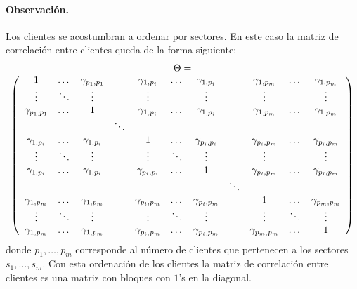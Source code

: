 \paragraph{Observaci\'on.} Los clientes se acostumbran a ordenar por sectores. En este
caso la matriz de correlaci\'on entre clientes queda de la forma siguiente:
\begin{displaymath}
\begin{array}{c}
\Theta = \\
\left(
\begin{array}{ccccccccccc}
1                & \dots    & \gamma_{p_1,p_1}  &          & \gamma_{1,p_i}   & \dots   & \gamma_{1,p_i}    &         & \gamma_{1,p_m}   & \dots      & \gamma_{1,p_m}   \cr
\vdots           & \ddots   & \vdots            &          & \vdots           &         & \vdots            &         & \vdots           &            & \vdots           \cr
\gamma_{p_1,p_1} & \dots    & 1                 &          & \gamma_{1,p_i}   & \dots   & \gamma_{1,p_i}    &         & \gamma_{1,p_m}   & \dots      & \gamma_{1,p_m}   \cr
                 
                 &          &                   & \ddots   &                  &         &                   &         &                  &            &                  \cr

\gamma_{1,p_i}   & \dots    & \gamma_{1,p_i}    &          & 1                & \dots   & \gamma_{p_i,p_i}  &         & \gamma_{p_i,p_m} & \dots      & \gamma_{p_i,p_m} \cr
\vdots           & \ddots   & \vdots            &          & \vdots           & \ddots  & \vdots            &         & \vdots           &            & \vdots           \cr
\gamma_{1,p_i}   & \dots    & \gamma_{1,p_i}    &          & \gamma_{p_i,p_i} & \dots   & 1                 &         & \gamma_{p_i,p_m} & \dots      & \gamma_{p_i,p_m} \cr

                 &          &                   &          &                  &         &                   & \ddots  &                  &            &                  \cr

\gamma_{1,p_m}   & \dots    & \gamma_{1,p_m}    &          & \gamma_{p_i,p_m} & \dots   & \gamma_{p_i,p_m}  &         & 1                & \dots      & \gamma_{p_m,p_m} \cr
\vdots           & \ddots   & \vdots            &          & \vdots           & \ddots  & \vdots            &         & \vdots           & \ddots     & \vdots           \cr
\gamma_{1,p_m}   & \dots    & \gamma_{1,p_m}    &          & \gamma_{p_i,p_m} & \dots   & \gamma_{p_i,p_m}  &         & \gamma_{p_m,p_m} & \dots      & 1               
\end{array}
\right)
\end{array}
\end{displaymath}
donde $p_1, \dots, p_m$ corresponde al n\'umero de clientes que pertenecen a los sectores $s_1, \dots, s_m$.
Con esta ordenaci\'on de los clientes la matriz de correlaci\'on entre clientes es una matriz
con bloques con $1$'s en la diagonal.


